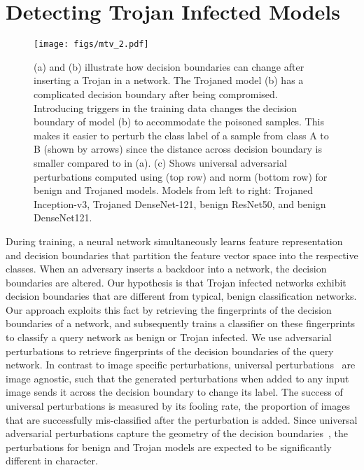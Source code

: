 \documentclass{article}
\begin{document}
\vspace{-4mm}
\section{Detecting Trojan Infected Models}
\label{sec:blind}
\vspace{-3mm}

\begin{figure}
\centering
\texttt{[image: figs/mtv\_2.pdf]}
\vspace{-10mm}
\caption{(a) and (b) illustrate how decision boundaries can change after inserting a Trojan in a network. The Trojaned model (b) has a complicated decision boundary after being compromised.
Introducing triggers in the training data changes the decision boundary of model (b) to accommodate the poisoned samples. This makes it easier to perturb the class label of a sample from class A to B (shown by arrows) since the distance across decision boundary is smaller compared to in (a). (c) Shows universal adversarial perturbations computed using  (top row) and  norm (bottom row) for benign and Trojaned models. Models from left to right: Trojaned Inception-v3, Trojaned DenseNet-121, benign ResNet50, and benign DenseNet121.}
\label{fig:db}
\vspace{-4mm}
\end{figure}










During training, a neural network simultaneously learns feature representation and decision boundaries that partition the feature vector space into the respective classes. When an adversary inserts a backdoor into a network, the decision boundaries are altered. Our hypothesis is that Trojan infected networks exhibit decision boundaries that are different from typical, benign classification networks. Our approach exploits this fact by retrieving the fingerprints of the decision boundaries of a network, and subsequently trains a classifier on these fingerprints to classify a query network as benign or Trojan infected. We use adversarial perturbations to retrieve fingerprints of the decision boundaries of the query network. In contrast to image specific perturbations, universal perturbations~\cite{moosavi2017universal} are image agnostic,  such that the generated perturbations when added to any input image sends it across the decision boundary to change its label. The success of universal perturbations is measured by its fooling rate, the  proportion of images that are successfully mis-classified after the perturbation is added. Since universal adversarial perturbations capture the geometry of the decision boundaries~\cite{moosavi2017universal}, the perturbations for benign and Trojan models are expected to be significantly different in character. 
\end{document}

